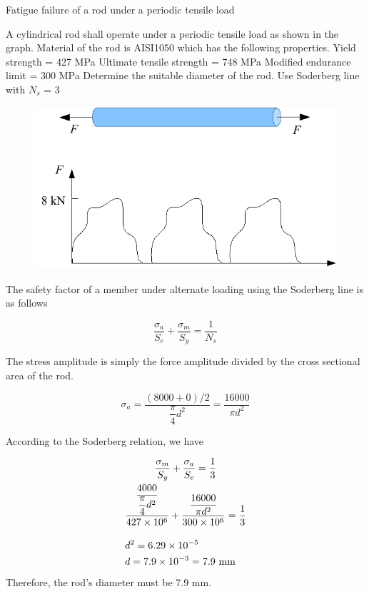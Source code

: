 \documentclass[
10pt,
a4paper,
openany,
svgnames,
]{book}
\begin{document}
\begin{example} Fatigue failure of a rod under a periodic tensile load

  A cylindrical rod shall operate under a periodic tensile load as shown in the graph. Material of the rod is AISI1050 which has the following properties.
  Yield strength = 427 MPa
  Ultimate tensile strength = 748 MPa
  Modified endurance limit = 300 MPa
  Determine the suitable diameter of the rod. Use Soderberg line with $N_s$ = 3

  \begin{figure}[H]
    \centering
    \includegraphics[scale=0.9]{pictures/Failure-theories/fatigue-example}
  \end{figure}
\end{example}
\begin{solution}
    The safety factor of a member under alternate loading using the Soderberg line is as follows

    \[\frac{\sigma_a}{S_e} + \frac{\sigma_m}{S_y} = \frac{1}{N_s}\]

  The stress amplitude is simply the force amplitude divided by the cross sectional area of the rod.

  \[\sigma_a = \frac{(8000 + 0)/2}{\dfrac{\pi }{4}d^2} = \frac{16000}{\pi d^2}\]

  According to the Soderberg relation, we have

  \begin{gather*}
    \frac{\sigma_m}{S_y} + \frac{\sigma _a}{S_e} = \frac{1}{3} \\ 
    \dfrac{\dfrac{4000}{\dfrac{\pi }{4}d^2}}{427 \times 10^6} + \dfrac{\dfrac{16000}{\pi d^2}}{300 \times 10^6} = \frac{1}{3} \\[1em] 
    d^2 = 6.29 \times 10^{-5} \hfill \\
    d = 7.9 \times 10^{-3} = 7.9 \text{ mm} \hfill \\ 
  \end{gather*}
  Therefore, the rod’s diameter must be 7.9 mm.
\end{solution}
\end{document}

